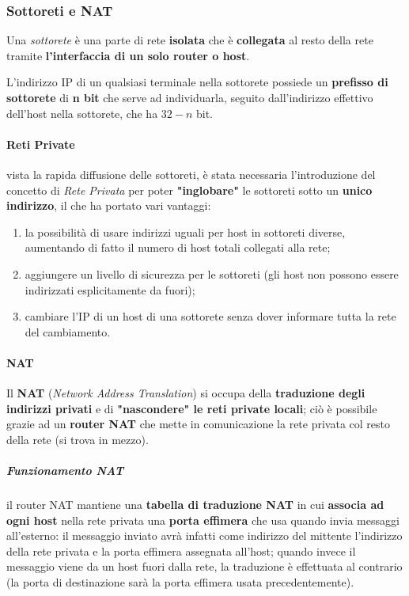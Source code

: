 \documentclass[a4paper]{article}
\begin{document}
				
			
		\subsubsection{Sottoreti e NAT}
		
			Una \emph{sottorete} è una parte di rete \textbf{isolata} che è \textbf{collegata} al resto della rete tramite \textbf{l'interfaccia di un solo router o host}.
			
			L'indirizzo IP di un qualsiasi terminale nella sottorete possiede un \textbf{prefisso di sottorete} di \textbf{n bit} che serve ad individuarla, seguito dall'indirizzo effettivo dell'host nella sottorete, che ha $ 32 - n $ bit.
			
			\paragraph{Reti Private}
				vista la rapida diffusione delle sottoreti, è stata necessaria l'introduzione del concetto di \emph{Rete Privata} per poter \textbf{"inglobare"} le sottoreti sotto un \textbf{unico indirizzo}, il che ha portato vari vantaggi:
				\begin{enumerate}
					\item la possibilità di usare indirizzi uguali per host in sottoreti diverse, aumentando di fatto il numero di host totali collegati alla rete;
					\item aggiungere un livello di sicurezza per le sottoreti (gli host non possono essere indirizzati esplicitamente da fuori);
					\item cambiare l'IP di un host di una sottorete senza dover informare tutta la rete del cambiamento.
				\end{enumerate}
		
			\paragraph{NAT}
				Il \textbf{NAT} (\emph{Network Address Translation}) si occupa della \textbf{traduzione degli indirizzi privati} e di \textbf{"nascondere" le reti private locali}; ciò è possibile grazie ad un \textbf{router NAT} che mette in comunicazione la rete privata col resto della rete (si trova in mezzo).
				
				\subparagraph{Funzionamento NAT}
					il router NAT mantiene una \textbf{tabella di traduzione NAT} in cui \textbf{associa ad ogni host} nella rete privata una \textbf{porta effimera} che usa quando invia messaggi all'esterno: il messaggio inviato avrà infatti come indirizzo del mittente l'indirizzo della rete privata e la porta effimera assegnata all'host; quando invece il messaggio viene da un host fuori dalla rete, la traduzione è effettuata al contrario (la porta di destinazione sarà la porta effimera usata precedentemente).
					
\end{document}
